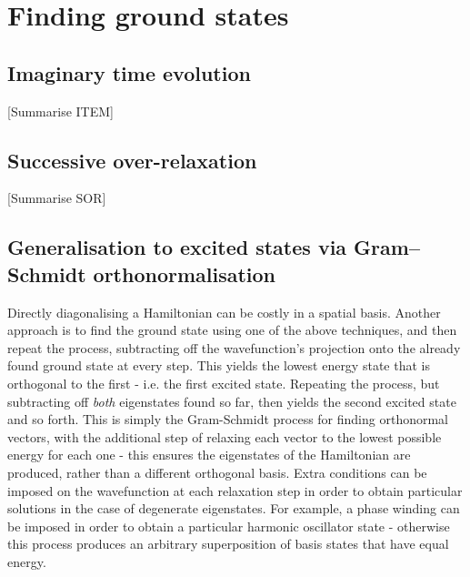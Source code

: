 \section{Finding ground states}
\subsection{Imaginary time evolution}
[Summarise ITEM]
\subsection{Successive over-relaxation}
[Summarise SOR]
\subsection{Generalisation to excited states via Gram–Schmidt orthonormalisation}
Directly diagonalising a Hamiltonian can be costly in a spatial basis. Another approach is to find the ground state using one of the above techniques, and then repeat the process, subtracting off the wavefunction's projection onto the already found ground state at every step. This yields the lowest energy state that is orthogonal to the first - i.e. the first excited state. Repeating the process, but subtracting off \emph{both} eigenstates found so far, then yields the second excited state and so forth. This is simply the Gram-Schmidt process for finding orthonormal vectors, with the additional step of relaxing each vector to the lowest possible energy for each one - this ensures the eigenstates of the Hamiltonian are produced, rather than a different orthogonal basis. Extra conditions can be imposed on the wavefunction at each relaxation step in order to obtain particular solutions in the case of degenerate eigenstates. For example, a phase winding can be imposed in order to obtain a particular harmonic oscillator state - otherwise this process produces an arbitrary superposition of basis states that have equal energy.




